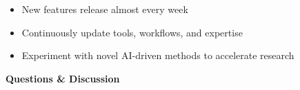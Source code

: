 \documentclass[aspectratio=169]{beamer}
\begin{document}
\begin{frame}
\large
\begin{itemize}
\setlength{\itemsep}{0.4cm}
\item New features release almost every week
\item Continuously update tools, workflows, and expertise
\item Experiment with novel AI-driven methods to accelerate research
\end{itemize}
\end{frame}

\begin{frame}

\vspace{2cm}
\centering
\Huge
\textbf{Questions \& Discussion}

\end{frame}


% 
%
\end{document}
